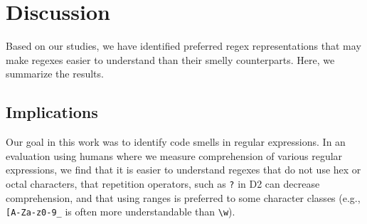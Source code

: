 \section{Discussion}
\label{sec:discussion}
Based on our studies, we have identified preferred regex representations that may make regexes easier to understand than their smelly counterparts. Here, we summarize the results.


\subsection{Implications}
Our goal in this work was to identify code smells in regular expressions.
In an evaluation using humans where we measure comprehension of various regular expressions, we find that it is easier to understand regexes that do not use hex or octal characters,
that repetition operators, such as \verb!?! in D2 can decrease comprehension, and that using ranges is preferred to some character classes (e.g., \verb![A-Za-z0-9_! is often more understandable than \verb!\w!).

